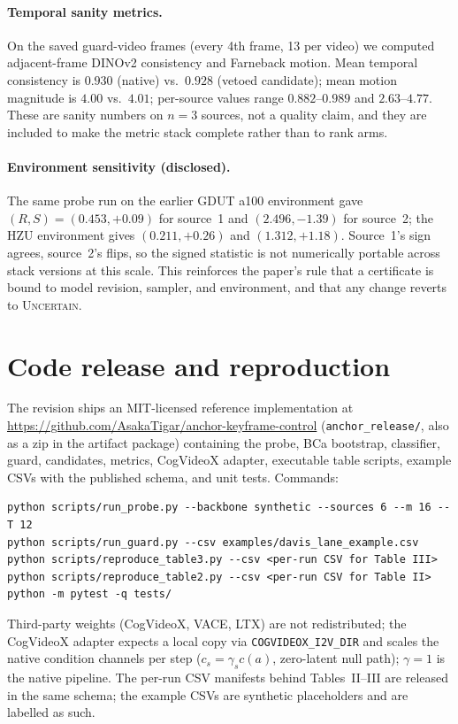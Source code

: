 \documentclass[letterpaper]{article}
\begin{document}
\paragraph{Temporal sanity metrics.} On the saved guard-video frames
(every 4th frame, 13 per video) we computed adjacent-frame DINOv2
consistency and Farneback motion. Mean temporal consistency is $0.930$
(native) vs.\ $0.928$ (vetoed candidate); mean motion magnitude is
$4.00$ vs.\ $4.01$; per-source values range $0.882$--$0.989$ and
$2.63$--$4.77$. These are sanity numbers on $n{=}3$ sources, not a
quality claim, and they are included to make the metric stack complete
rather than to rank arms.

\paragraph{Environment sensitivity (disclosed).} The same probe run on
the earlier GDUT a100 environment gave $(R,S)=(0.453,{+}0.09)$ for
source~1 and $(2.496,-1.39)$ for source~2; the HZU environment gives
$(0.211,{+}0.26)$ and $(1.312,{+}1.18)$. Source~1's sign agrees,
source~2's flips, so the signed statistic is not numerically portable
across stack versions at this scale. This reinforces the paper's rule
that a certificate is bound to model revision, sampler, and
environment, and that any change reverts to \textsc{Uncertain}.

\section{Code release and reproduction}
\label{sec:supp-code}

The revision ships an MIT-licensed reference implementation at
\url{https://github.com/AsakaTigar/anchor-keyframe-control}
(\texttt{anchor\_release/}, also as a zip in the artifact package)
containing the probe, BCa bootstrap, classifier, guard, candidates,
metrics, CogVideoX adapter, executable table scripts, example CSVs with
the published schema, and unit tests. Commands:

\begin{verbatim}
python scripts/run_probe.py --backbone synthetic --sources 6 --m 16 --T 12
python scripts/run_guard.py --csv examples/davis_lane_example.csv
python scripts/reproduce_table3.py --csv <per-run CSV for Table III>
python scripts/reproduce_table2.py --csv <per-run CSV for Table II>
python -m pytest -q tests/
\end{verbatim}

Third-party weights (CogVideoX, VACE, LTX) are not redistributed; the
CogVideoX adapter expects a local copy via
\texttt{COGVIDEOX\_I2V\_DIR} and scales the native condition channels
per step ($c_s=\gamma_s c(a)$, zero-latent null path); $\gamma{=}1$ is
the native pipeline. The per-run CSV manifests behind Tables~II--III
are released in the same schema; the example CSVs are synthetic
placeholders and are labelled as such.
\end{document}
